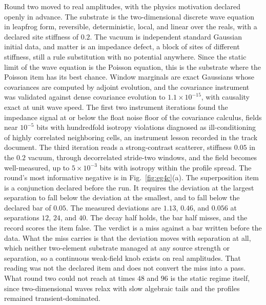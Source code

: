 \documentclass[aps,pre,reprint,nofootinbib]{revtex4-2}
\begin{document}
Round two moved to real amplitudes, with the physics motivation
declared openly in advance.  The substrate is the two-dimensional
discrete wave equation in leapfrog form, reversible, deterministic,
local, and linear over the reals, with a declared site stiffness of
$0.2$.  The vacuum is independent standard Gaussian initial data,
and matter is an impedance defect, a block of sites of different
stiffness,
still a rule substitution with no potential anywhere.  Since the
static limit of the wave equation is the Poisson equation, this is
the substrate where the Poisson item has its best chance.  Window marginals
are exact Gaussians whose covariances are computed by adjoint
evolution, and the covariance instrument was validated against dense
covariance evolution to $1.1\times10^{-15}$, with causality exact at
unit wave speed.  The first two instrument iterations found the
impedance signal at or below the float noise floor of the covariance
calculus, fields near $10^{-5}$ bits with hundredfold isotropy
violations diagnosed as ill-conditioning of highly correlated
neighboring cells, an instrument lesson recorded in the track
document.  The third iteration reads a strong-contrast scatterer,
stiffness $0.05$ in the $0.2$ vacuum, through decorrelated
stride-two windows, and the field becomes well-measured, up to
$5\times10^{-3}$ bits with isotropy within the profile spread.  The
round's most informative negative is in Fig.~\ref{fig:eg4c}(a).  The
superposition item is a conjunction declared before the run.  It
requires the deviation at the largest separation to fall below the
deviation at the smallest, and to fall below the declared bar of
$0.05$.  The measured deviations are $1.13$, $0.46$, and $0.056$ at
separations $12$, $24$, and $40$.  The decay half holds, the bar
half misses, and the record scores the item false.  The verdict is a
miss against a bar written before the data.  What the miss carries
is that the deviation moves with separation at all, which neither
two-element substrate managed at any source strength or separation,
so a continuous weak-field knob exists on real amplitudes.  That
reading was not the declared item and does not convert the miss into
a pass.  What round two could not
reach at times $48$ and $96$ is the static regime itself, since
two-dimensional waves relax with slow algebraic tails and the
profiles remained transient-dominated.
\end{document}
